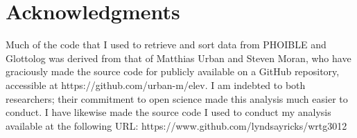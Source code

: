 \documentclass{article}
\begin{document}
\section{Acknowledgments}

Much of the code that I used to retrieve and sort data from PHOIBLE and Glottolog was derived from that of Matthias Urban and Steven Moran, who have graciously made the source code for \textcite{urban2021} publicly available on a GitHub repository, accessible at https://github.com/urban-m/elev. I am indebted to both researchers; their commitment to open science made this analysis much easier to conduct. I have likewise made the source code I used to conduct my analysis available at the following URL: https://www.github.com/lyndsayricks/wrtg3012

\pagebreak

\printbibliography

\pagebreak
\end{document}
